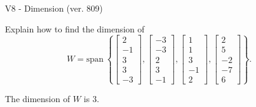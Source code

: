 \begin{exercise}
  \begin{exerciseTitle}V8 - Dimension (ver. 809)\end{exerciseTitle}
  \begin{exerciseStatement}
    Explain how to find the dimension of 
\[W=\mathrm{span}\ \left\{\left[\begin{array}{r}
2 \\
-1 \\
3 \\
3 \\
-3
\end{array}\right] , \left[\begin{array}{r}
-3 \\
-3 \\
2 \\
3 \\
-1
\end{array}\right] , \left[\begin{array}{r}
1 \\
1 \\
3 \\
-1 \\
2
\end{array}\right] , \left[\begin{array}{r}
2 \\
5 \\
-2 \\
-7 \\
6
\end{array}\right]\right\}.\]



  \end{exerciseStatement}
  \begin{exerciseAnswer}
   The dimension of \(W\) is  \(3\).
  


  \end{exerciseAnswer}
\end{exercise}